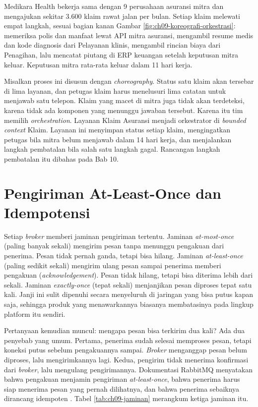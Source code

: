 \begin{kasus}[title={Kasus Medikara Health: Klaim dari Mitra Asuransi sebagai Orchestration}]
  Medikara Health bekerja sama dengan 9 perusahaan asuransi mitra dan mengajukan sekitar 3.600 klaim
  rawat jalan per bulan. Setiap klaim melewati empat langkah, sesuai bagian kanan Gambar
  \ref{fig:ch09-koreografi-orkestrasi}: memeriksa polis dan manfaat lewat API mitra asuransi,
  mengambil resume medis dan kode diagnosis dari Pelayanan klinis, mengambil rincian biaya dari
  Penagihan, lalu mencatat piutang di ERP keuangan setelah keputusan mitra keluar. Keputusan mitra
  rata-rata keluar dalam 11 hari kerja.

  Misalkan proses ini disusun dengan \textit{choreography}. Status satu klaim akan tersebar di lima
  layanan, dan petugas klaim harus menelusuri lima catatan untuk menjawab satu telepon. Klaim yang
  macet di mitra juga tidak akan terdeteksi, karena tidak ada komponen yang menunggu jawaban
  tersebut. Karena itu tim memilih \textit{orchestration}. Layanan Klaim Asuransi menjadi
  orkestrator di \textit{bounded context} Klaim. Layanan ini menyimpan status setiap klaim,
  mengingatkan petugas bila mitra belum menjawab dalam 14 hari kerja, dan menjalankan langkah
  pembatalan bila salah satu langkah gagal. Rancangan langkah pembatalan itu dibahas pada Bab 10.
\end{kasus}

\section{Pengiriman At-Least-Once dan Idempotensi}
\label{sec:ch09-idempoten}

Setiap \textit{broker} memberi jaminan pengiriman tertentu. Jaminan \textit{at-most-once} (paling
banyak sekali) mengirim pesan tanpa menunggu pengakuan dari penerima. Pesan tidak pernah ganda,
tetapi bisa hilang. Jaminan \textit{at-least-once} (paling sedikit sekali) mengirim ulang pesan
sampai penerima memberi pengakuan (\textit{acknowledgement}). Pesan tidak hilang, tetapi bisa
diterima lebih dari sekali. Jaminan \textit{exactly-once} (tepat sekali) menjanjikan pesan diproses
tepat satu kali. Janji ini sulit dipenuhi secara menyeluruh di jaringan yang bisa putus kapan saja,
sehingga produk yang menawarkannya biasanya membatasinya pada lingkup platform itu sendiri.

Pertanyaan kemudian muncul: mengapa pesan bisa terkirim dua kali? Ada dua penyebab yang umum.
Pertama, penerima sudah selesai memproses pesan, tetapi koneksi putus sebelum pengakuannya sampai.
\textit{Broker} menganggap pesan belum diproses, lalu mengirimkannya lagi. Kedua, pengirim tidak
menerima konfirmasi dari \textit{broker}, lalu mengulang pengirimannya. Dokumentasi RabbitMQ
menyatakan bahwa pengakuan menjamin pengiriman \textit{at-least-once}, bahwa penerima harus siap
menerima pesan yang pernah dilihatnya, dan bahwa penerima sebaiknya dirancang idempoten
\cite{c09-rabbitmq-reliability}. Tabel \ref{tab:ch09-jaminan} merangkum ketiga jaminan itu.

